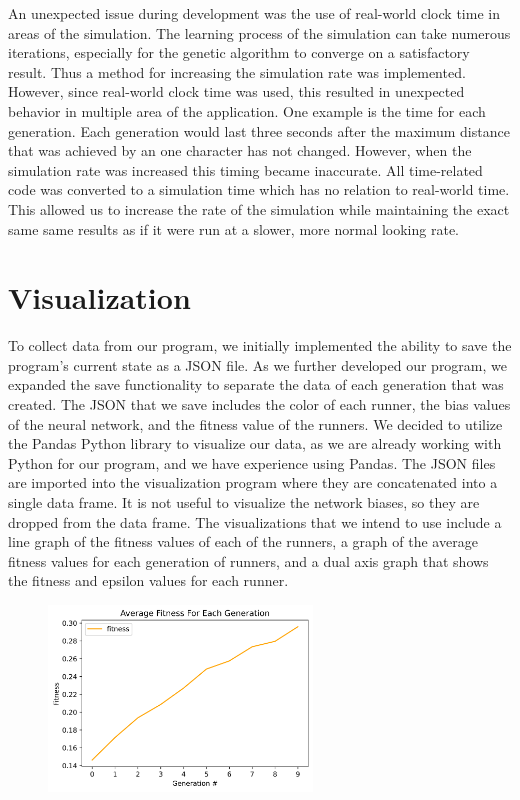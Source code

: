 \documentclass[letterpaper]{article} %
\begin{document}
\par An unexpected issue during development was the use of real-world clock time in areas of the simulation. The learning process of the simulation can take numerous iterations, especially for the genetic algorithm to converge on a satisfactory result. Thus a method for increasing the simulation rate was implemented. However, since real-world clock time was used, this resulted in unexpected behavior in multiple area of the application. One example is the time for each generation. Each generation would last three seconds after the maximum distance that was achieved by an one character has not changed. However, when the simulation rate was increased this timing became inaccurate. All time-related code was converted to a simulation time which has no relation to real-world time. This allowed us to increase the rate of the simulation while maintaining the exact same same results as if it were run at a slower, more normal looking rate.

\section{Visualization}

\par To collect data from our program, we initially implemented the ability to save the program's current state as a JSON file. As we further developed our program, we expanded the save functionality to separate the data of each generation that was created. The JSON that we save includes the color of each runner, the bias values of the neural network, and the fitness value of the runners. We decided to utilize the Pandas Python library to visualize our data, as we are already working with Python for our program, and we have experience using Pandas. The JSON files are imported into the visualization program where they are concatenated into a single data frame. It is not useful to visualize the network biases, so they are dropped from the data frame. The visualizations that we intend to use include a line graph of the fitness values of each of the runners, a graph of the average fitness values for each generation of runners, and a dual axis graph that shows the fitness and epsilon values for each runner.

\begin{figure}[h]
\centering
\includegraphics[width=7cm]{avg_fitness_per_gen.png}
\end{figure}
\end{document}
